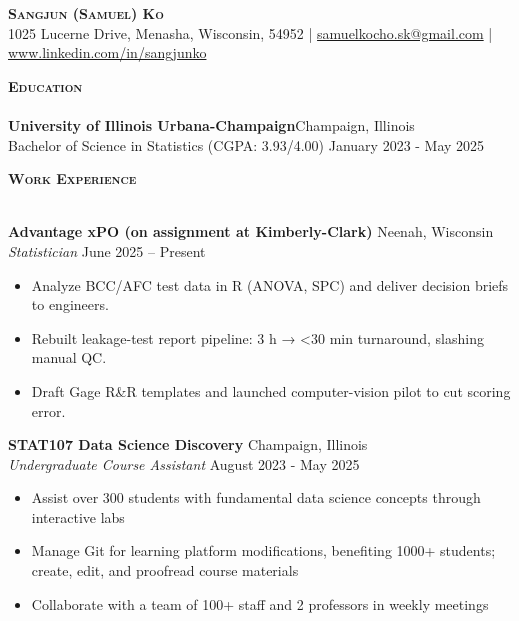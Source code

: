 \documentclass[a4paper]{article}
\newcommand{\lineunder} {
    \vspace*{-8pt} \\
    \hspace*{-18pt} \hrulefill \\
}
\newcommand{\header} [1] {
    {\hspace*{-18pt}\vspace*{6pt} \textsc{#1}}
    \vspace*{-6pt} \lineunder
}
\begin{document}
\vspace*{-40pt}

    

\vspace*{-10pt}
\begin{center}
	{\Huge \scshape \textbf{Sangjun (Samuel) Ko}}\\
    1025 Lucerne Drive, Menasha, Wisconsin, 54952 
    | \href{mailto:samuelkocho.sk@gmai.com}{samuelkocho.sk@gmail.com}
    | \href{https://www.linkedin.com/in/sangjunko}{www.linkedin.com/in/sangjunko}

	  
\end{center}

\header{\textbf{Education}}
\textbf{University of Illinois Urbana-Champaign}\hfill Champaign, Illinois \\
Bachelor of Science in Statistics (CGPA: 3.93/4.00) \hfill January 2023 - May 2025\\



\vspace{2mm}

\header{\textbf{Work Experience}}
\vspace{1mm}

\textbf{Advantage xPO (on assignment at Kimberly-Clark)}
\hfill Neenah, Wisconsin\\
\textit{Statistician} \hfill June 2025 -- Present\\
\begin{itemize}[noitemsep]
    \item Analyze BCC/AFC test data in R (ANOVA, SPC) and deliver decision briefs to engineers.  
    \item Rebuilt leakage-test report pipeline: 3 h → <30 min turnaround, slashing manual QC.  
    \item Draft Gage R\&R templates and launched computer-vision pilot to cut scoring error.    
\end{itemize}

\vspace{1mm}

\textbf{STAT107 Data Science Discovery} 
\hfill Champaign, Illinois\\
\textit{Undergraduate Course Assistant} \hfill August 2023 - May 2025\\
    \begin{itemize}[noitemsep]
    \item Assist over 300 students with fundamental data science concepts through interactive labs
    \item Manage Git for learning platform modifications, 
    benefiting 1000+ students; create, edit, and proofread course materials
    \item Collaborate with a team of 100+ staff and 2 professors in weekly meetings 
    \end{itemize}
\end{document}
